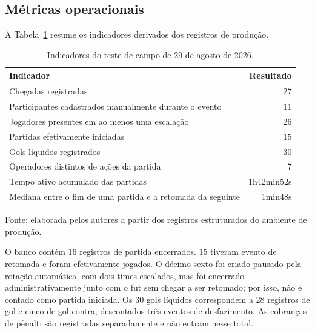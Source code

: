     \subsection{Métricas operacionais}

        A Tabela~\ref{tab:campo-resultados} resume os indicadores derivados dos registros de produção.

        \begin{table}[htb]
            \centering
            \caption{Indicadores do teste de campo de 29 de agosto de 2026.}
            \label{tab:campo-resultados}
            \begin{tabular}{p{7.3cm}r}
                \toprule
                \textbf{Indicador} & \textbf{Resultado} \\
                \midrule
                Chegadas registradas & 27 \\
                Participantes cadastrados manualmente durante o evento & 11 \\
                Jogadores presentes em ao menos uma escalação & 26 \\
                Partidas efetivamente iniciadas & 15 \\
                Gols líquidos registrados & 30 \\
                Operadores distintos de ações da partida & 7 \\
                Tempo ativo acumulado das partidas & 1h42min52s \\
                Mediana entre o fim de uma partida e a retomada da seguinte & 1min48s \\
                \bottomrule
            \end{tabular}

            \vspace{2pt}
            {\footnotesize Fonte: elaborada pelos autores a partir dos registros estruturados do ambiente de produção.}
        \end{table}

        O banco contém 16 registros de partida encerrados. 15 tiveram evento de retomada e foram efetivamente jogados. O décimo sexto foi criado pausado pela rotação automática, com dois times escalados, mas foi encerrado administrativamente junto com o fut sem chegar a ser retomado; por isso, não é contado como partida iniciada. Os 30 gols líquidos correspondem a 28 registros de gol e cinco de gol contra, descontados três eventos de desfazimento. As cobranças de pênalti são registradas separadamente e não entram nesse total.

